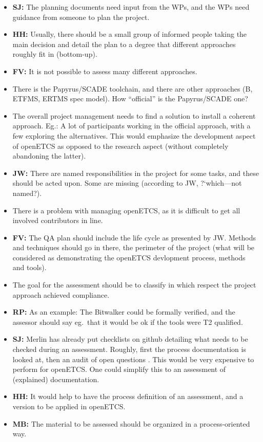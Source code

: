 \documentclass[a4paper,german]{article}
\newcommand{\qq}[1]{?`#1?}
\begin{document}
\begin{itemize}
\item \textbf{SJ:} The planning documents need input from the WPs, and
  the WPs need guidance from someone to plan the project.
\item \textbf{HH:} Usually, there should be a small group of informed
  people taking the main decision and detail the plan to a degree that
  different approaches roughly fit in (bottom-up).
\item \textbf{FV:} It is not possible to assess many different approaches.
\item There is the Papyrus/SCADE toolchain, and there are other
  approaches (B, ETFMS, ERTMS spec model). How ``official'' is the
  Papyrus/SCADE one?
\item The overall project management needs to find a solution to
  install a coherent approach. Eg.:  A lot of participants working in
  the official approach, with a few exploring the alternatives. This
  would emphasize the development aspect of openETCS as opposed to the
  research aspect (without completely abandoning the latter).
\item \textbf{JW:} There are named responsibilities in the project for
  some tasks, and these should be acted upon. Some are missing
  (according to JW, \qq{which---not named}).
\item There is a problem with managing openETCS, as it is difficult to
  get all involved contributors in line.
\item \textbf{FV:} The QA plan should include the life cycle as
  presented by JW. Methods and techniques should go in there, the
  perimeter of the project (what will be considered as demonstrating
  the openETCS devlopment process, methods and tools).
\item The goal for the assessment should be to classify in which
  respect the project approach achieved compliance.
\item \textbf{RP:} As an example: The Bitwalker could be formally verified, and the
  assessor should say eg.\ that it would be ok if the tools were T2
  qualified.
\item \textbf{SJ:} Merlin has already put checklists on github
  detailing what needs to be checked during an assessment. Roughly,
  first the process documentation is looked at, then an audit of open questions . This would
  be very expensive to perform for openETCS. One could simplify this
  to an assessment of (explained) documentation.
\item \textbf{HH:} It would help to have the process definition of an
  assessment, and a version to be applied in openETCS.
\item \textbf{MB:} The material to be assessed should be organized in
  a process-oriented way. 
\end{itemize}
 
\end{document}
